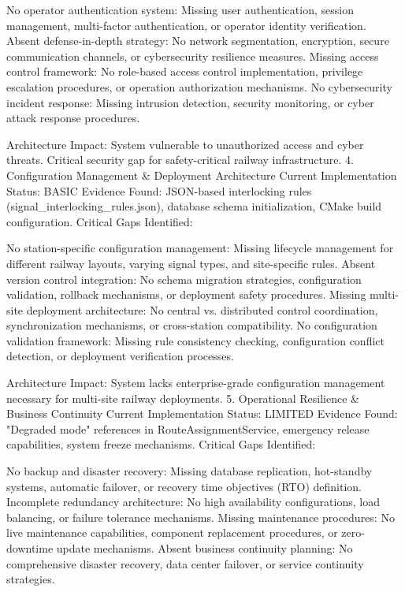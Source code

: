 No operator authentication system: Missing user authentication, session management, multi-factor authentication, or operator identity verification.
Absent defense-in-depth strategy: No network segmentation, encryption, secure communication channels, or cybersecurity resilience measures.
Missing access control framework: No role-based access control implementation, privilege escalation procedures, or operation authorization mechanisms.
No cybersecurity incident response: Missing intrusion detection, security monitoring, or cyber attack response procedures.

Architecture Impact: System vulnerable to unauthorized access and cyber threats. Critical security gap for safety-critical railway infrastructure.
4. Configuration Management & Deployment Architecture
Current Implementation Status: BASIC
Evidence Found: JSON-based interlocking rules (signal_interlocking_rules.json), database schema initialization, CMake build configuration.
Critical Gaps Identified:

No station-specific configuration management: Missing lifecycle management for different railway layouts, varying signal types, and site-specific rules.
Absent version control integration: No schema migration strategies, configuration validation, rollback mechanisms, or deployment safety procedures.
Missing multi-site deployment architecture: No central vs. distributed control coordination, synchronization mechanisms, or cross-station compatibility.
No configuration validation framework: Missing rule consistency checking, configuration conflict detection, or deployment verification processes.

Architecture Impact: System lacks enterprise-grade configuration management necessary for multi-site railway deployments.
5. Operational Resilience & Business Continuity
Current Implementation Status: LIMITED
Evidence Found: "Degraded mode" references in RouteAssignmentService, emergency release capabilities, system freeze mechanisms.
Critical Gaps Identified:

No backup and disaster recovery: Missing database replication, hot-standby systems, automatic failover, or recovery time objectives (RTO) definition.
Incomplete redundancy architecture: No high availability configurations, load balancing, or failure tolerance mechanisms.
Missing maintenance procedures: No live maintenance capabilities, component replacement procedures, or zero-downtime update mechanisms.
Absent business continuity planning: No comprehensive disaster recovery, data center failover, or service continuity strategies.

